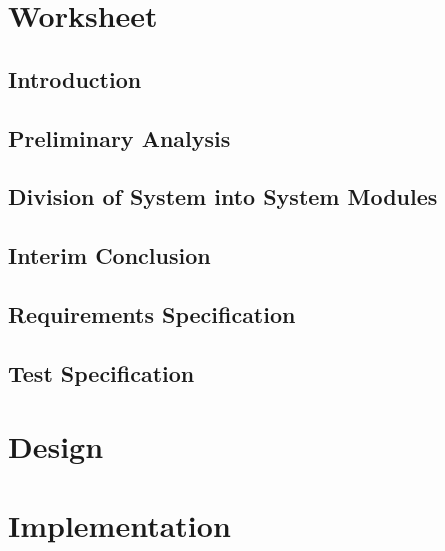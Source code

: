 





\pagestyle{empty}


\pagestyle{fancy}
\setcounter{page}{1}

\tableofcontents
\cleardoublepage
\setcounter{page}{1}



\part{Worksheet}
    \chapter{Introduction} \label{cha:introduction}
    \chapter{Preliminary Analysis} \label{cha:preliminary_analysis}
    \chapter{Division of System into System Modules}
    \chapter{Interim Conclusion}
    \chapter{Requirements Specification} \label{cha:requirements}
    \chapter{Test Specification}
    
\part{Design}
\part{Implementation}








